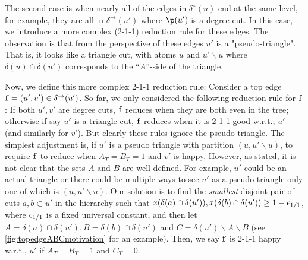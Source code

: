 The second case is when nearly all of the edges in   $\delta^\uparrow(u)$ end at the same level, for example, they are all in $\delta^\rightarrow(u')$ where $\p(u')$ is a degree cut. In this case,
we introduce a more complex (2-1-1) reduction rule for these edges.
The observation is that from the perspective of these edges $u'$ is a "pseudo-triangle". That is, it looks like a triangle cut, with atoms $u$ and $u'\smallsetminus u$ where $\delta(u)\cap\delta(u')$ corresponds to the ``$A$''-side of the triangle. %

Now, we define this more complex 2-1-1 reduction rule: Consider a top edge ${\bf f}=(u',v')\in\delta^\rightarrow(u')$. So far, we only considered the following reduction rule for ${\bf f}$: If both $u',v'$ are degree cuts, ${\bf f}$ reduces when they are both even in the tree; otherwise if say $u'$ is a triangle cut, ${\bf f}$ reduces when it is 2-1-1 good w.r.t., $u'$ (and similarly for $v'$). 
But clearly these rules ignore the pseudo triangle.  The simplest adjustment is, if $u'$ is a pseudo triangle with partition $(u,u'\smallsetminus u)$, to require ${\bf f}$ to reduce when $A_T=B_T=1$ and $v'$ is happy. However, as stated, it is not clear that the sets $A$ and $B$ are well-defined. For example, $u'$ could be an actual triangle or there  could be multiple ways to see $u'$ as a pseudo triangle only one of which is $(u, u'\smallsetminus u)$. Our solution is to find the {\em smallest} disjoint pair of cuts $a,b\subset u'$ in the hierarchy such that $x(\delta(a)\cap\delta(u')),x(\delta(b)\cap\delta(u'))\geq 1-{\epsilon}_{1/1}$, where ${\epsilon}_{1/1}$ is a fixed universal constant, and then let $A=\delta(a)\cap\delta(u'), B=\delta(b)\cap\delta(u')$ and $C=\delta(u')\smallsetminus A\smallsetminus B$ (see \cref{fig:topedgeABCmotivation} for an example). Then, we say ${\bf f}$ is 2-1-1 happy w.r.t., $u'$ if $A_T=B_T=1$ and $C_T=0$.

